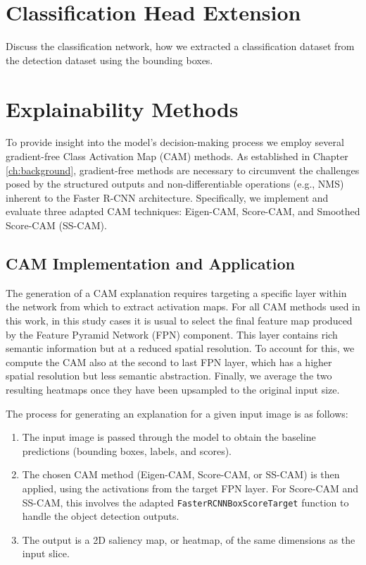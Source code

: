 \section{Classification Head Extension}
Discuss the classification network, how we extracted a classification dataset from the detection dataset using the bounding boxes. 


\section{Explainability Methods}
\label{sec:xai_methods}

To provide insight into the model's decision-making process we employ several gradient-free Class Activation Map (CAM) methods. As established in Chapter \ref{ch:background}, gradient-free methods are necessary to circumvent the challenges posed by the structured outputs and non-differentiable operations (e.g., NMS) inherent to the Faster R-CNN architecture. Specifically, we implement and evaluate three adapted CAM techniques: Eigen-CAM, Score-CAM, and Smoothed Score-CAM (SS-CAM).

\subsection{CAM Implementation and Application}
\label{subsec:cam_implementation}

The generation of a CAM explanation requires targeting a specific layer within the network from which to extract activation maps. For all CAM methods used in this work, in this study cases it is usual to select the final feature map produced by the Feature Pyramid Network (FPN) component. This layer contains rich semantic information but at a reduced spatial resolution. To account for this, we compute the CAM also at the second to last FPN layer, which has a higher spatial resolution but less semantic abstraction. 
Finally, we average the two resulting heatmaps once they have been upsampled to the original input size.

The process for generating an explanation for a given input image is as follows:
\begin{enumerate}
    \item The input image is passed through the model to obtain the baseline predictions (bounding boxes, labels, and scores).
    \item The chosen CAM method (Eigen-CAM, Score-CAM, or SS-CAM) is then applied, using the activations from the target FPN layer. For Score-CAM and SS-CAM, this involves the adapted \texttt{FasterRCNNBoxScoreTarget} function to handle the object detection outputs.
    \item The output is a 2D saliency map, or heatmap, of the same dimensions as the input slice.
\end{enumerate}

